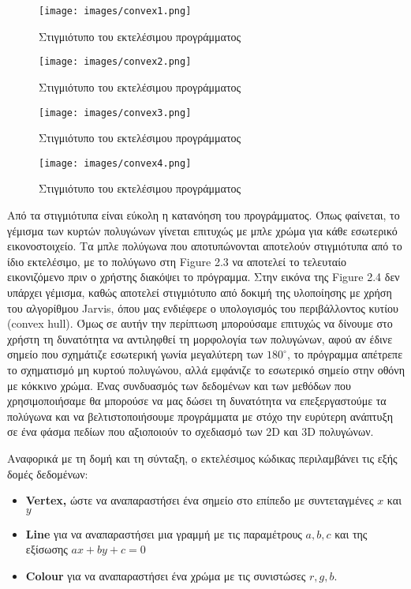 \begin{figure}
    \centering
    \texttt{[image: images/convex1.png]}
    \caption{Στιγμιότυπο του εκτελέσιμου προγράμματος}    
\end{figure}
\begin{figure}
    \centering
    \texttt{[image: images/convex2.png]}
    \caption{Στιγμιότυπο του εκτελέσιμου προγράμματος}    
\end{figure}
\begin{figure}
    \centering
    \texttt{[image: images/convex3.png]}
    \caption{Στιγμιότυπο του εκτελέσιμου προγράμματος}    
\end{figure}
\begin{figure}
    \centering
    \texttt{[image: images/convex4.png]}
    \caption{Στιγμιότυπο του εκτελέσιμου προγράμματος}    
\end{figure}
Από τα στιγμιότυπα είναι εύκολη η κατανόηση του προγράμματος. Όπως φαίνεται, το γέμισμα των κυρτών πολυγώνων γίνεται επιτυχώς με μπλε χρώμα για κάθε εσωτερικό εικονοστοιχείο. Τα μπλε πολύγωνα που αποτυπώνονται αποτελούν στιγμιότυπα από το ίδιο εκτελέσιμο, με το πολύγωνο στη \textlatin{Figure 2.3} να αποτελεί το τελευταίο εικονιζόμενο πριν ο χρήστης διακόψει το πρόγραμμα. Στην εικόνα της \textlatin{Figure 2.4} δεν υπάρχει γέμισμα, καθώς αποτελεί στιγμιότυπο από δοκιμή της υλοποίησης με χρήση του αλγορίθμου Jarvis, όπου μας ενδιέφερε ο υπολογισμός του περιβάλλοντος κυτίου \textlatin{(convex hull)}. Όμως σε αυτήν την περίπτωση μπορούσαμε επιτυχώς να δίνουμε στο χρήστη τη δυνατότητα να αντιληφθεί τη μορφολογία των πολυγώνων, αφού αν έδινε σημείο που σχημάτιζε εσωτερική γωνία μεγαλύτερη των $180^\circ$, το πρόγραμμα απέτρεπε το σχηματισμό μη κυρτού πολυγώνου, αλλά εμφάνιζε το εσωτερικό σημείο στην οθόνη με κόκκινο χρώμα. Ένας συνδυασμός των δεδομένων και των μεθόδων που χρησιμοποιήσαμε θα μπορούσε να μας δώσει τη δυνατότητα να επεξεργαστούμε τα πολύγωνα και να βελτιστοποιήσουμε προγράμματα με στόχο την ευρύτερη ανάπτυξη σε ένα φάσμα πεδίων που αξιοποιούν το σχεδιασμό των \textlatin{2D} και \textlatin{3D} πολυγώνων.
\par
Aναφορικά με τη δομή και τη σύνταξη, ο εκτελέσιμος κώδικας περιλαμβάνει τις εξής δομές δεδομένων:
\vspace{1.5em}
\begin{itemize}
    \item \textbf{\textlatin{Vertex,}} ώστε να αναπαραστήσει ένα σημείο στο επίπεδο με συντεταγμένες $x$ και $y$
    \item \textbf{\textlatin{Line}} για να αναπαραστήσει μια γραμμή με τις παραμέτρους $a,b,c$ και της εξίσωσης $ax+by+c=0$
    \item \textbf{\textlatin{Colour}} για να αναπαραστήσει ένα χρώμα με τις συνιστώσες $r,g,b$.
\end{itemize} 
